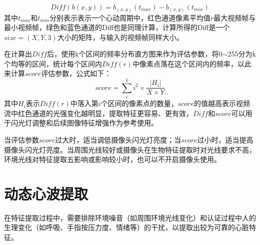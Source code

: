 \begin{equation}
    Diff(b(x,y))=b_{(x,y)}(t_{max})- b_{(x,y)}(t_{min})
\end{equation}
{
其中$t_{max}$和$t_{min}$分别表示表示一个心动周期中，红色通道像素平均值$\overline{r}$最大视频帧与最小视频帧，绿色和蓝色通道的Diff也是同理计算，计算所得的Diff是一个$size=(X,Y,3)$大小的矩阵，与输入的视频帧同样大小。
}
\par
{在计算出$Diff$后，使用k个区间的频率分布直方图来作为评估参数，将0$\sim$255分为k个均等的区间，统计每个区间内$Diff( r )$中像素点落在这个区间内的频率，以此来计算$score$评估参数，公式如下：}
\begin{equation}
    score=\sum_{i}^{k}{i^2\times \frac{|H_i|}{X\times Y}}
\end{equation}
{其中$H_i$表示$Diff( r ) $中落入第$i$个区间的像素点的数量，$score$的值越高表示视频流中红色通道的光强变化越明显，提取特征更容易、更有效，$Diff$和$score$可以用于闪光灯调整和后续图像特征增强作为参考使用。}
\par
{当评估参数$score$过大时，适当调低摄像头闪光灯亮度；当$score$过小时，适当提高摄像头闪光灯亮度。当周围光线较好或摄像头在生物特征提取时对光线要求不高，环境光线对特征提取五影响或影响较小时，也可以不开启摄像头使用。}

%
%
%
%
%
%

\section{动态心波提取}
{在特征提取过程中，需要排除环境噪音（如周围环境光线变化）和认证过程中人的生理变化（如呼吸、手指按压力度、情绪等）的干扰，以提取出较为可靠的心脏特征。}
